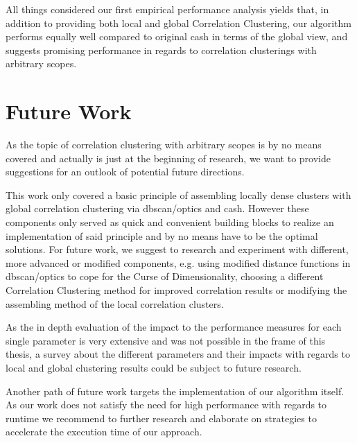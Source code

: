 All things considered our first empirical performance analysis yields that, in addition to providing both local and global Correlation Clustering, our algorithm performs equally well compared to original \gls{cash} in terms of the global view, and suggests promising performance in regards to correlation clusterings with arbitrary scopes.

\chapter{Future Work}\label{ch:futurework}
As the topic of correlation clustering with arbitrary scopes is by no means covered and actually is just at the beginning of research, we want to provide suggestions for an outlook of potential future directions. 

This work only covered a basic principle of assembling locally dense clusters with global correlation clustering via \gls{dbscan}/\gls{optics} and \gls{cash}. However these components only served as quick and convenient building blocks to realize an implementation of said principle and by no means have to be the optimal solutions. For future work, we suggest to research and experiment with different, more advanced or modified components, e.g. using modified distance functions in \gls{dbscan}/\gls{optics} to cope for the Curse of Dimensionality, choosing a different Correlation Clustering method for improved correlation results or modifying the assembling method of the local correlation clusters.

As the in depth evaluation of the impact to the performance measures for each single parameter is very extensive and was not possible in the frame of this thesis, a survey about the different parameters and their impacts with regards to local and global clustering results could be subject to future research.

Another path of future work targets the implementation of our algorithm itself. As our work does not satisfy the need for high performance with regards to runtime we recommend to further research and elaborate on strategies to accelerate the execution time of our approach.

